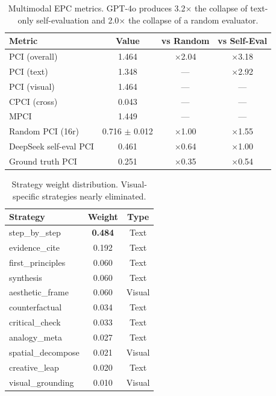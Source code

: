 \documentclass[11pt,a4paper]{article}
\begin{document}
\begin{table}[H]
\centering
\caption{Multimodal EPC metrics. GPT-4o produces 3.2$\times$ the collapse of text-only self-evaluation and 2.0$\times$ the collapse of a random evaluator.}
\begin{tabular}{lccc}
\toprule
\textbf{Metric} & \textbf{Value} & \textbf{vs Random} & \textbf{vs Self-Eval} \\
\midrule
PCI (overall)  & 1.464  & $\times$2.04 & $\times$3.18 \\
PCI (text)     & 1.348  & ---    & $\times$2.92 \\
PCI (visual)   & 1.464  & ---    & ---   \\
CPCI (cross)   & 0.043  & ---    & ---   \\
MPCI           & 1.449  & ---    & ---   \\
\midrule
Random PCI (16r) & 0.716 $\pm$ 0.012 & $\times$1.00 & $\times$1.55 \\
DeepSeek self-eval PCI & 0.461 & $\times$0.64 & $\times$1.00 \\
Ground truth PCI & 0.251 & $\times$0.35 & $\times$0.54 \\
\bottomrule
\end{tabular}
\end{table}


\begin{table}[H]
\centering
\caption{Strategy weight distribution. Visual-specific strategies nearly eliminated.}
\small
\begin{tabular}{lcc}
\toprule
\textbf{Strategy} & \textbf{Weight} & \textbf{Type} \\
\midrule
step\_by\_step     & \textbf{0.484} & Text \\
evidence\_cite     & 0.192 & Text \\
first\_principles  & 0.060 & Text \\
synthesis         & 0.060 & Text \\
aesthetic\_frame   & 0.060 & Visual \\
counterfactual    & 0.034 & Text \\
critical\_check    & 0.033 & Text \\
analogy\_meta      & 0.027 & Text \\
spatial\_decompose & 0.021 & Visual \\
creative\_leap     & 0.020 & Text \\
visual\_grounding  & 0.010 & Visual \\
\bottomrule
\end{tabular}
\end{table}
\end{document}

